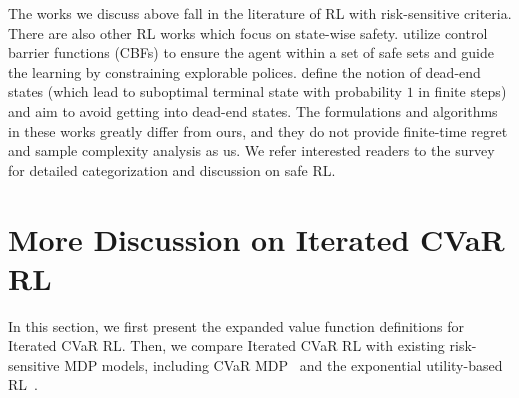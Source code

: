 The works we discuss above fall in the literature of RL with risk-sensitive criteria. There are also other RL works which focus on state-wise safety. \cite{cheng2019end} utilize control barrier functions (CBFs) to ensure the agent within a set of safe sets and guide the learning by constraining explorable polices. \cite{fatemi2019dead,fatemi2021medical} define the notion of dead-end states (which lead to suboptimal terminal state with probability $1$ in finite steps) and aim to avoid getting into dead-end states. 
The formulations and algorithms in these works greatly differ from ours, and they do not provide finite-time regret and sample complexity analysis as us.
We refer interested readers to the survey~\citep{garcia2015comprehensive} for detailed categorization and discussion on safe RL.



\section{More Discussion on Iterated CVaR RL}

In this section, we first present the expanded value function definitions for Iterated CVaR RL. Then, we compare Iterated CVaR RL with existing risk-sensitive MDP models, including CVaR MDP~\citep{boda2006time,ott2010markov,bauerle2011markov,chow2015risk} and the exponential utility-based RL~\citep{fei2020near_optimal,fei2021exponential}.

